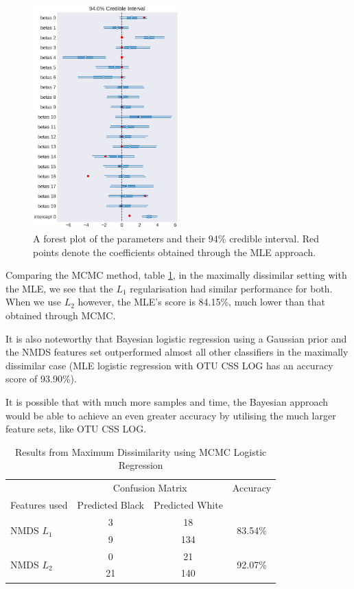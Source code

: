 \begin{figure}[!htb]
	\centering
	\includegraphics[width = 0.5\textwidth]{forest_sim_l1}
	\caption{A forest plot of the parameters and their 94\% credible interval. Red points denote the coefficients obtained through the MLE approach.}
	\label{fig:forest_sim_l1}
\end{figure}

Comparing the MCMC method, table \ref{table:bay_dissim}, in the maximally dissimilar setting with the MLE, we see that the $L_1$ regularisation had similar performance for both. When we use $L_2$ however, the MLE's score is 84.15\%, much lower than that obtained through MCMC. 

It is also noteworthy that Bayesian logistic regression using a Gaussian prior and the NMDS features set outperformed almost all other classifiers in the maximally dissimilar case (MLE logistic regression with OTU CSS LOG has an accuracy score of 93.90\%).



It is possible that with much more samples and time, the Bayesian approach would be able to achieve an even greater accuracy by utilising the much larger feature sets, like OTU CSS LOG. 

\begin{table}[!htb]
	\centering
	\caption{Results from Maximum Dissimilarity using MCMC Logistic Regression}
	\label{table:bay_dissim}
	\begin{tabular}{l c  c c}
		\toprule
		&\multicolumn{2}{c}{Confusion Matrix} & Accuracy\\
		Features used & Predicted Black&Predicted White&\\
		\midrule
		\multirow{2}{*}{NMDS $L_1$} &3 &18&\multirow{2}{*}{83.54\%}\\
		&	9&134&\\
		\cmidrule{2-3}
		\multirow{2}{*}{NMDS $L_2$} &0&21&\multirow{2}{*}{92.07\%}\\
		&	21&140&\\
		
		\bottomrule
	\end{tabular}
	
\end{table}
